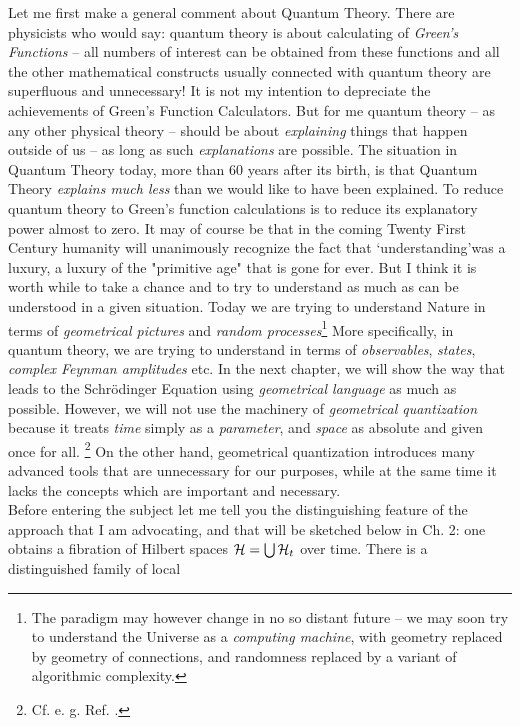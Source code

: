 \documentclass[12pt]{article}
\begin{document}
Let me first make a general comment about Quantum Theory.  There are
physicists who would say:  quantum theory is about calculating of {\sl 
Green's Functions} -- all numbers of interest can be obtained from these
functions and all the other mathematical constructs usually connected with 
quantum theory are
superfluous and unnecessary! It is not my intention to depreciate the 
achievements of Green's
Function Calculators.  But for me quantum theory -- 
as any other physical theory -- should be
about  {\sl explaining} things that happen outside of us -- as long as such {\sl 
explanations} are possible.  The situation in Quantum Theory today,  more than
60 years after its birth,  is that Quantum Theory {\sl explains much less}
than we would like to have been explained.
To reduce quantum theory to Green's
function calculations  is to reduce its explanatory power almost
to  zero.  
 It may of course be that in the coming 
  Twenty First  Century humanity will unanimously
recognize the fact that `understanding'\thinspace was a luxury,  a luxury of
the "primitive age" that is gone for ever.  But I think it is worth
while to take a chance and to try to  understand as much as can be
understood in a given situation.  Today we are trying to understand Nature
in terms of {\sl geometrical pictures} and
{\sl random processes}\footnote{The paradigm  may however change in no so
distant  future -- we may soon try to understand the Universe as a
{\sl computing machine},  with geometry replaced by geometry of
connections,  and randomness replaced by a variant of algorithmic
complexity. } More specifically,  in quantum theory,  we are trying to
understand in terms of {\sl observables},  {\sl states}, 
{\sl complex Feynman amplitudes}
etc.  In the next chapter,  we will show the way that leads to the
 Schr\"odinger Equation using
{\sl geometrical language} as much as possible.  However,  we will not use the
machinery of {\sl geometrical quantization} because it treats {\sl time}
simply as a {\sl parameter},  and {\sl space} as absolute and
given once for all. \footnote{Cf.  e. g.  Ref.  \cite[Ch. 9]{snia}. }
On the other hand,  geometrical quantization introduces many
advanced tools
that are unnecessary
for our purposes,  while at the same time it lacks the concepts which are
important and necessary. \\ 
Before entering the subject let me tell you the
distinguishing feature of the approach that I am advocating,  and that
will be sketched below in Ch. 
2:  one obtains a fibration of Hilbert spaces ${\cal H}=\bigcup {\cal H}
_t$ over time.  There is  a distinguished family of local
\end{document}

